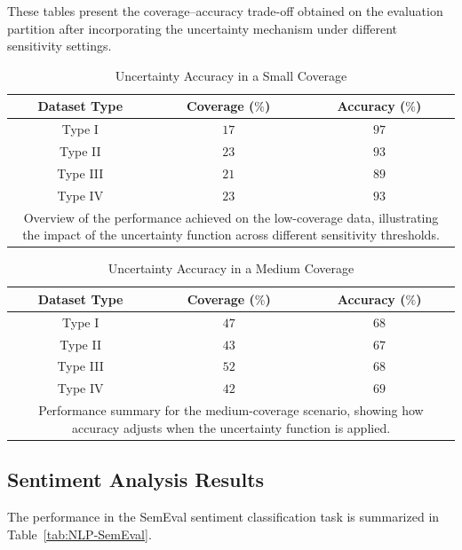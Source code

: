 \documentclass[conference]{IEEEtran}
\begin{document}
These tables present the coverage–accuracy trade-off obtained on the evaluation partition after incorporating the uncertainty mechanism under different sensitivity settings.

\begin{table}[H]
    \centering
    \caption{Uncertainty Accuracy in a Small Coverage}
    \label{tab:Uncertainty-Accuracy-Small}
    \begin{tabular}{c c c}
        \hline
        Dataset Type & Coverage ($\%$) & Accuracy ($\%$)\\
        \hline
        Type I & $17$ & $97$\\
        Type II & $23$ & $93$\\
        Type III & $21$ & $89$\\
        Type IV & $23$ & $93$\\
        \hline
        \multicolumn{3}{p{0.9\linewidth}}{\centering
        Overview of the performance achieved on the low-coverage data, illustrating the impact of the uncertainty function across different sensitivity thresholds.
        }
    \end{tabular}
\end{table}

\begin{table}[H]
    \centering
    \caption{Uncertainty Accuracy in a Medium Coverage}
    \label{tab:Uncertainty-Accuracy-Medium}
    \begin{tabular}{c c c}
        \hline
        Dataset Type & Coverage ($\%$) & Accuracy ($\%$)\\
        \hline
        Type I & $47$ & $68$\\
        Type II & $43$ & $67$\\
        Type III & $52$ & $68$\\
        Type IV & $42$ & $69$\\
        \hline
        \multicolumn{3}{p{0.9\linewidth}}{\centering
        Performance summary for the medium-coverage scenario, showing how accuracy adjusts when the uncertainty function is applied.
        }
    \end{tabular}
\end{table}

\subsection{Sentiment Analysis Results}

The performance in the SemEval sentiment classification task is summarized in Table~\ref{tab:NLP-SemEval}.
\end{document}
